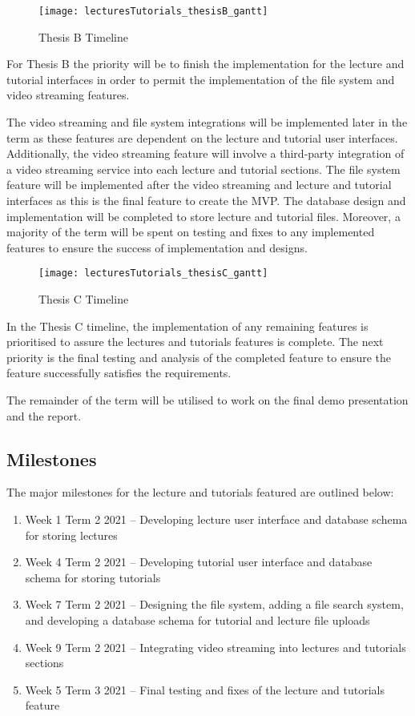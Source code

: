 \begin{figure}[h!]
    \centering
    \texttt{[image: lecturesTutorials\_thesisB\_gantt]}
    \caption{Thesis B Timeline}
\end{figure}

For Thesis B the priority will be to finish the implementation for the lecture and tutorial interfaces in order to permit 
the implementation of the file system and video streaming features.

The video streaming and file system integrations will be implemented later in the term as these features are dependent on 
the lecture and tutorial user interfaces. Additionally, the video streaming feature will involve a third-party integration 
of a video streaming service into each lecture and tutorial sections. The file system feature will be implemented after the 
video streaming and lecture and tutorial interfaces as this is the final feature to create the MVP. The database design and 
implementation will be completed to store lecture and tutorial files. Moreover, a majority of the term will be spent on testing 
and fixes to any implemented features to ensure the success of implementation and designs.

\begin{figure}[h!]
    \centering
    \texttt{[image: lecturesTutorials\_thesisC\_gantt]}
    \caption{Thesis C Timeline}
\end{figure}

In the Thesis C timeline, the implementation of any remaining features is prioritised to assure the lectures and 
tutorials features is complete. The next priority is the final testing and analysis of the completed feature to 
ensure the feature successfully satisfies the requirements. 

The remainder of the term will be utilised to work on the final demo presentation and the report. 

\subsection{Milestones}
The major milestones for the lecture and tutorials featured are outlined below:

\begin{enumerate}
\item Week 1 Term 2 2021 – Developing lecture user interface and database schema for storing lectures
\item Week 4 Term 2 2021 – Developing tutorial user interface and database schema for storing tutorials
\item Week 7 Term 2 2021 – Designing the file system, adding a file search system, and developing a database schema for tutorial and lecture file uploads
\item Week 9 Term 2 2021 – Integrating video streaming into lectures and tutorials sections
\item Week 5 Term 3 2021 – Final testing and fixes of the lecture and tutorials feature
\end{enumerate}

